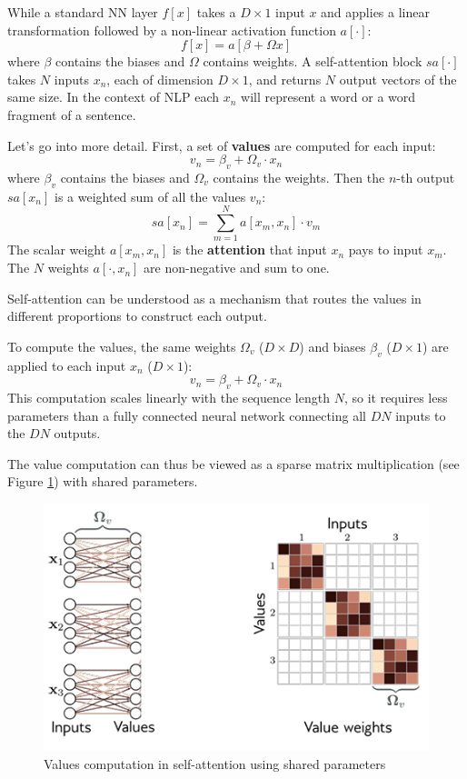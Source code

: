 While a standard NN layer $f[x]$ takes a $D\times 1$ input $x$ and applies a
linear transformation followed by a non-linear activation function $a[\cdot]$:
\begin{equation*}
    f[x] = a[\beta + \Omega x]
\end{equation*}
where $\beta$ contains the biases and $\Omega$ contains weights. A self-attention
block $sa[\cdot]$ takes $N$ inputs $x_n$, each of dimension $D \times 1$, and
returns $N$ output vectors of the same size. In the context of NLP each $x_n$
will represent a word or a word fragment of a sentence.

Let's go into more detail. First, a set of \textbf{values} are computed for each
input:
\begin{equation}
    v_n = \beta_v + \Omega_v \cdot x_n
\end{equation}
where $\beta_v$ contains the biases and $\Omega_v$ contains the weights. Then the
$n$-th output $sa[x_n]$ is a weighted sum of all the values $v_n$:
\begin{equation}
    sa[x_n] = \sum_{m = 1}^N a[x_m, x_n] \cdot v_m
\end{equation}
The scalar weight $a[x_m, x_n]$ is the \textbf{attention} that input $x_n$ pays
to input $x_m$. The $N$ weights $a[\cdot, x_n]$ are non-negative and sum to one.

Self-attention can be understood as a mechanism that routes the values in different
proportions to construct each output.

To compute the values, the same weights $\Omega_v$ ($D \times D$) and biases
$\beta_v$ ($D \times 1$) are applied to each input $x_n$ ($D \times 1$):
\begin{equation}
    v_n = \beta_v + \Omega_v \cdot x_n
\end{equation}
This computation scales linearly with the sequence length $N$, so it requires less
parameters than a fully connected neural network connecting all $DN$ inputs to
the $DN$ outputs.

The value computation can thus be viewed as a sparse matrix multiplication (see
Figure \ref{fig:valuesComputation}) with shared parameters.
\begin{figure}[!ht]
    \centering
    \includegraphics[width=0.5\linewidth]{img/transformer/values.png}
    \caption{Values computation in self-attention using shared parameters}
    \label{fig:valuesComputation}
\end{figure}

